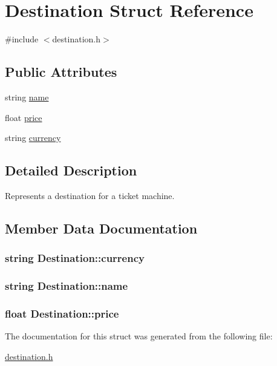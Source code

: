 \hypertarget{structDestination}{\section{Destination Struct Reference}
\label{structDestination}
}


{\ttfamily \#include $<$destination.\-h$>$}

\subsection*{Public Attributes}
\begin{DoxyCompactItemize}
\item 
string \hyperlink{structDestination_a06f463b8bcd6e5ae0c73e36e8f888f1f}{name}
\item 
float \hyperlink{structDestination_ae1f8135f13ad4a30f519ef4c85cf4a1a}{price}
\item 
string \hyperlink{structDestination_af1050e1a2a7f928ffc9a18ee8942292d}{currency}
\end{DoxyCompactItemize}


\subsection{Detailed Description}
Represents a destination for a ticket machine. 

\subsection{Member Data Documentation}
\hypertarget{structDestination_af1050e1a2a7f928ffc9a18ee8942292d}{
\subsubsection[{currency}]{\setlength{\rightskip}{0pt plus 5cm}string Destination\-::currency}}\label{structDestination_af1050e1a2a7f928ffc9a18ee8942292d}
\hypertarget{structDestination_a06f463b8bcd6e5ae0c73e36e8f888f1f}{
\subsubsection[{name}]{\setlength{\rightskip}{0pt plus 5cm}string Destination\-::name}}\label{structDestination_a06f463b8bcd6e5ae0c73e36e8f888f1f}
\hypertarget{structDestination_ae1f8135f13ad4a30f519ef4c85cf4a1a}{
\subsubsection[{price}]{\setlength{\rightskip}{0pt plus 5cm}float Destination\-::price}}\label{structDestination_ae1f8135f13ad4a30f519ef4c85cf4a1a}


The documentation for this struct was generated from the following file\-:\begin{DoxyCompactItemize}
\item 
\hyperlink{destination_8h}{destination.\-h}\end{DoxyCompactItemize}
